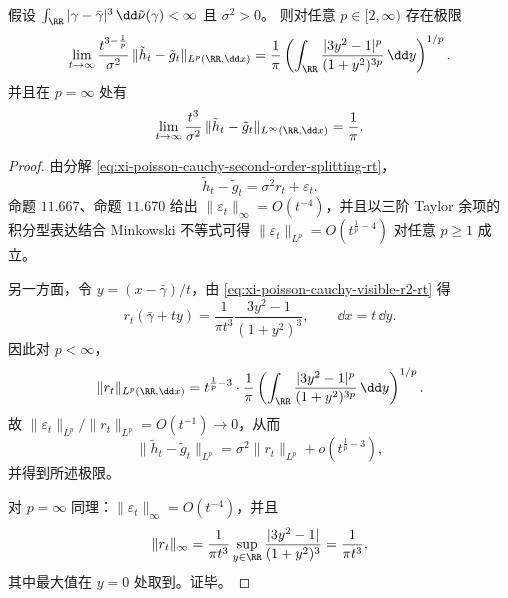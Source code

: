 \begin{theorem}\label{thm:xi-poisson-cauchy-lp-sharp-spectrum}
假设 \(\int_{\RR}|\gamma-\bar\gamma|^3\,\dd\tilde\nu(\gamma)<\infty\) 且 \(\sigma^2>0\)。
则对任意 \(p\in[2,\infty)\) 存在极限
\[
\lim_{t\to\infty}\frac{t^{3-\frac1p}}{\sigma^2}\,
\|\tilde h_t-\tilde g_t\|_{L^p(\RR,\dd x)}
=\frac{1}{\pi}\left(\int_{\RR}\frac{|3y^2-1|^{p}}{(1+y^2)^{3p}}\,\dd y\right)^{1/p}.
\]
并且在 \(p=\infty\) 处有
\[
\lim_{t\to\infty}\frac{t^{3}}{\sigma^2}\,
\|\tilde h_t-\tilde g_t\|_{L^\infty(\RR,\dd x)}
=\frac{1}{\pi}.
\]
\end{theorem}
\begin{proof}
由分解 \eqref{eq:xi-poisson-cauchy-second-order-splitting-rt}，
\[
\tilde h_t-\tilde g_t=\sigma^2 r_t+\varepsilon_t.
\]
命题 \(11.667\)、命题 \(11.670\) 给出 \(\|\varepsilon_t\|_\infty=O(t^{-4})\)，并且以三阶 Taylor 余项的积分型表达结合 Minkowski 不等式可得
\(
\|\varepsilon_t\|_{L^p}=O(t^{\frac1p-4})
\)
对任意 \(p\ge 1\) 成立。

另一方面，令 \(y=(x-\bar\gamma)/t\)，由 \eqref{eq:xi-poisson-cauchy-visible-r2-rt} 得
\[
r_t(\bar\gamma+ty)=\frac{1}{\pi t^3}\frac{3y^2-1}{(1+y^2)^3},
\qquad \dd x=t\,\dd y.
\]
因此对 \(p<\infty\)，
\[
\|r_t\|_{L^p(\RR,\dd x)}
=t^{\frac1p-3}\cdot \frac{1}{\pi}\left(\int_{\RR}\frac{|3y^2-1|^{p}}{(1+y^2)^{3p}}\,\dd y\right)^{1/p}.
\]
故
\(
\|\varepsilon_t\|_{L^p}/\|r_t\|_{L^p}=O(t^{-1})\to 0
\)，从而
\[
\|\tilde h_t-\tilde g_t\|_{L^p}
=\sigma^2\|r_t\|_{L^p}+o\!\left(t^{\frac1p-3}\right),
\]
并得到所述极限。

对 \(p=\infty\) 同理：\(\|\varepsilon_t\|_\infty=O(t^{-4})\)，并且
\[
\|r_t\|_\infty=\frac{1}{\pi t^3}\sup_{y\in\RR}\frac{|3y^2-1|}{(1+y^2)^3}
=\frac{1}{\pi t^3},
\]
其中最大值在 \(y=0\) 处取到。证毕。
\end{proof}

